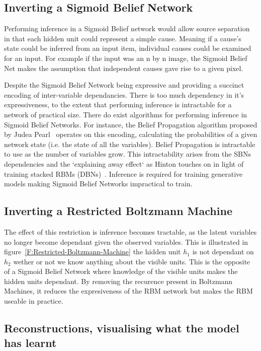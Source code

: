 \subsection{Inverting a Sigmoid Belief Network}

Performing inference in a Sigmoid Belief network would allow source separation in that each hidden unit could represent a simple cause. Meaning if a cause's state could be inferred from an input item, individual causes could be examined for an input. For example if the input was an n by n image, the Sigmoid Belief Net makes the assumption that independent causes gave rise to a given pixel.

Despite the Sigmoid Belief Network being expressive and providing a succinct encoding of inter-variable dependancies. There is too much dependency in it's expressiveness, to the extent that performing inference is intractable for a network of practical size. There do exist algorithms for performing inference in Sigmoid Belief Networks. For instance, the Belief Propagation algorithm proposed by Judea Pearl~\cite{Pearl1982} operates on this encoding, calculating the probabilities of a given network state (i.e. the state of all the variables).  Belief Propagation is intractable to use as the number of variables grow. This intractability arises from the SBNs dependencies and the `explaining away effect` as Hinton touches on in light of training stacked RBMs (DBNs)~\cite{Hinton:2006:FLA:1161603.1161605}. Inference is required for training generative models making Sigmoid Belief Networks impractical to train.

\subsection{Inverting a Restricted Boltzmann Machine}

The effect of this restriction is inference becomes tractable, as the latent variables no longer become dependant given the observed variables. This is illustrated in figure~\ref{F:Restricted-Boltzmann-Machine} the hidden unit $h_1$ is not dependant on $h_2$ wether or not we know anything about the visible units. This is the opposite of a Sigmoid Belief Network where knowledge of the visible units makes the hidden units dependant. By removing the recurence present in Boltzmann Machines, it reduces the expresiveness of the RBM network but makes the RBM useable in practice.

\subsection{Reconstructions, visualising what the model has learnt}

